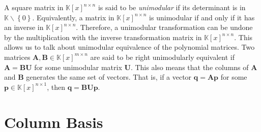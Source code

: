 A square matrix in $\mathbb{K}\left[x\right]^{n\times n}$ is said
to be \emph{unimodular} if its determinant is in $\mathbb{K}\backslash\left\{ 0\right\} $.
Equivalently, a matrix in $\mathbb{K}\left[x\right]^{n\times n}$
is unimodular if and only if it has an inverse in $\mathbb{K}\left[x\right]^{n\times n}$.
Therefore, a unimodular transformation can be undone by the multiplication
with the inverse transformation matrix in $\mathbb{K}\left[x\right]^{n\times n}$.
This allows us to talk about unimodular equivalence of the polynomial
matrices. Two matrices $\mathbf{A},\mathbf{B}\in\mathbb{K}\left[x\right]^{m\times n}$
are said to be right unimodularly equivalent if $\mathbf{A}=\mathbf{B}\mathbf{U}$
for some unimodular matrix $\mathbf{U}$. This also means that the
columns of $\mathbf{A}$ and $\mathbf{B}$ generates the same set
of vectors. That is, if a vector $\mathbf{q}=\mathbf{A}\mathbf{p}$
for some $\mathbf{p}\in\mathbb{K}\left[x\right]^{n\times1}$, then
$\mathbf{q}=\mathbf{B}\mathbf{U}\mathbf{p}$.


\section{Column Basis}

